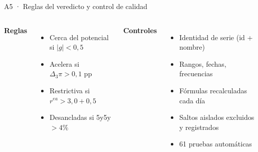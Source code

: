 \documentclass[aspectratio=169,11pt]{beamer}
\begin{document}
\begin{frame}{A5 · Reglas del veredicto y control de calidad}
\small
\begin{columns}[T]
\textbf{Reglas}
\begin{itemize}
\item Cerca del potencial si $|g|<0{,}5$
\item Acelera si $\Delta_3\pi>0{,}1$ pp
\item Restrictiva si $r^{ea}>3{,}0+0{,}5$
\item Desancladas si 5y5y $>4\%$
\end{itemize}
\textbf{Controles}
\begin{itemize}
\item Identidad de serie (id + nombre)
\item Rangos, fechas, frecuencias
\item Fórmulas recalculadas cada día
\item Saltos aislados excluidos y registrados
\item 61 pruebas automáticas
\end{itemize}
\end{columns}
\end{frame}
\end{document}
